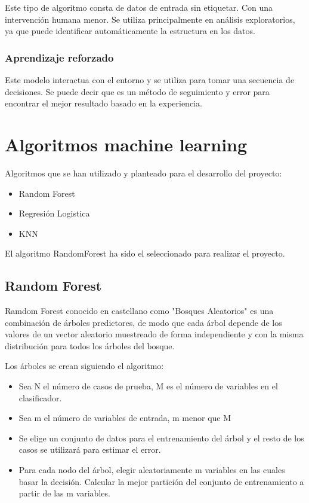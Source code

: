 Este tipo de algoritmo consta de datos de entrada sin etiquetar. Con una intervención humana menor. Se utiliza principalmente en análisis exploratorios, ya que puede identificar automáticamente la estructura en los datos.

\subsubsection{Aprendizaje reforzado}

Este modelo interactua con el entorno y se utiliza para tomar una secuencia de decisiones. Se puede decir que es un método de seguimiento y error para encontrar el mejor resultado basado en la experiencia.

\section{Algoritmos machine learning}

Algoritmos que se han utilizado y planteado para el desarrollo del proyecto:

\begin{itemize}
\item Random Forest
\item Regresión Logistica
\item KNN
\end{itemize}

El algoritmo RandomForest ha sido el seleccionado para realizar el proyecto.

\subsection{Random Forest}

Ramdom Forest conocido en castellano como "Bosques Aleatorios" es una combinación de árboles predictores, de modo que cada árbol depende de los valores de un vector aleatorio muestreado de forma independiente y con la misma distribución para todos los árboles del bosque.

Los árboles se crean siguiendo el algoritmo:


\begin{itemize}
\item Sea N el número de casos de prueba, M es el número de variables en el clasificador.
\item Sea m el número de variables de entrada, m menor que M
\item Se elige un conjunto de datos para el entrenamiento del árbol y el resto de los casos se utilizará para estimar el error.
\item Para cada nodo del árbol, elegir aleatoriamente m variables en las cuales basar la decisión. Calcular la mejor partición del conjunto de entrenamiento a partir de las m variables.
\end{itemize}

